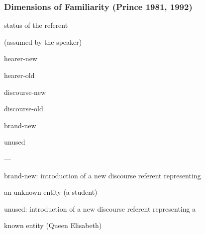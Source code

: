 \documentclass[compress,color=usenames]{beamer}
\begin{document}
\begin{frame}
\frametitle{
Dimensions of Familiarity (Prince 1981, 1992)}



status of the referent



(assumed by the speaker)



hearer-new



hearer-old






discourse-new






discourse-old






brand-new



unused





---






brand-new: introduction of a new discourse referent representing



an unknown entity (a student)



unused: introduction of a new discourse referent representing a



known entity (Queen Elisabeth)










\end{frame}
\end{document}
